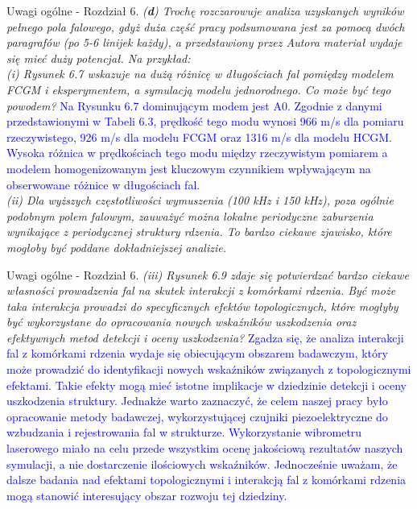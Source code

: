 \documentclass[10pt,aspectratio=169]{beamer} %
\begin{document}
\begin{frame}[label=frame26]{Uwagi ogólne - Rozdział 6.}\justifying
\textit{(\textbf{d}) Trochę rozczarowuje analiza uzyskanych wyników pełnego pola falowego, gdyż duża część pracy podsumowana jest za pomocą dwóch paragrafów (po 5-6 linijek każdy), a przedstawiony przez Autora materiał wydaje się mieć duży potencjał. Na przykład:\\
(i) Rysunek 6.7 wskazuje na dużą różnicę w długościach fal pomiędzy modelem	FCGM i eksperymentem, a symulacją modelu jednorodnego. Co może być tego powodem?} \textcolor{blue}{ Na Rysunku 6.7 dominującym modem jest A0. Zgodnie z danymi przedstawionymi w Tabeli 6.3, prędkość tego modu wynosi 966 m/s dla pomiaru rzeczywistego, 926 m/s dla modelu FCGM oraz 1316 m/s dla modelu HCGM. Wysoka różnica w prędkościach tego modu między rzeczywistym pomiarem a modelem homogenizowanym jest kluczowym czynnikiem wpływającym na obserwowane różnice w długościach fal.} \\
\textit{(ii) Dla wyższych częstotliwości wymuszenia (100 kHz i 150 kHz), poza ogólnie podobnym polem falowym, zauważyć można lokalne periodyczne zaburzenia wynikające z periodycznej struktury rdzenia. To bardzo ciekawe zjawisko, które mogłoby być poddane dokładniejszej analizie.}
\end{frame}
\begin{frame}[label=frame27]{Uwagi ogólne - Rozdział 6.}\justifying
\textit{(iii) Rysunek 6.9 zdaje się potwierdzać bardzo ciekawe własności prowadzenia fal na	skutek interakcji z komórkami rdzenia. Być może taka interakcja prowadzi do specyficznych efektów topologicznych, które mogłyby być wykorzystane do opracowania nowych wskaźników uszkodzenia oraz efektywnych metod detekcji i oceny uszkodzenia?} \textcolor{blue}{Zgadza się, że analiza interakcji fal z komórkami rdzenia wydaje się obiecującym obszarem badawczym, który może prowadzić do identyfikacji nowych wskaźników związanych z topologicznymi efektami. Takie efekty mogą mieć istotne implikacje w dziedzinie detekcji i oceny uszkodzenia struktury. Jednakże warto zaznaczyć, że celem naszej pracy było opracowanie metody badawczej, wykorzystującej czujniki piezoelektryczne do wzbudzania i rejestrowania fal w strukturze. Wykorzystanie wibrometru laserowego miało na celu przede wszystkim ocenę jakościową rezultatów naszych symulacji, a nie dostarczenie ilościowych wskaźników. Jednocześnie uważam, że dalsze badania nad efektami topologicznymi i interakcją fal z komórkami rdzenia mogą stanowić interesujący obszar rozwoju tej dziedziny.}
\end{frame}
\end{document}
